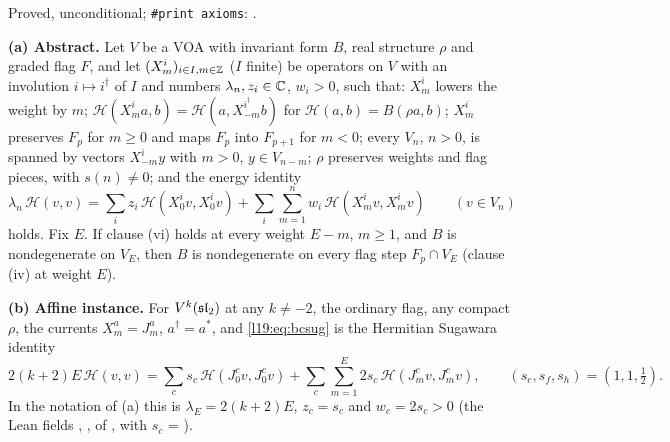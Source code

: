 \begin{status}
Proved, unconditional; \texttt{\#print axioms}: .
\end{status}

\begin{theorem}\label{l19:thm:bcnowall}
\textbf{(a) Abstract.} Let $V$ be a VOA with invariant form $B$, real structure $\rho$ and graded flag $F$, and let
$(X^i_m)_{i\in I,m\in{\mathbb{Z}}}$ ($I$ finite) be operators on $V$ with an involution $i\mapsto i^\dagger$ of $I$ and numbers
$\lambda_n,z_i\in{\mathbb{C}}$, $w_i>0$, such that: $X^i_m$ lowers the weight by $m$; $\mathcal H(X^i_ma,b) = \mathcal H(a,X^{i^\dagger}_{-m}b)$
for $\mathcal H(a,b) = B(\rho a,b)$; $X^i_m$ preserves $F_p$ for $m\ge0$ and maps $F_p$ into $F_{p+1}$ for $m<0$; every
$V_n$, $n>0$, is spanned by vectors $X^i_{-m}y$ with $m>0$, $y\in V_{n-m}$; $\rho$ preserves weights and flag pieces,
with $s(n)\ne0$; and the energy identity
\begin{equation}\label{l19:eq:bcsug}
  \lambda_n\,\mathcal H(v,v) = \sum_iz_i\,\mathcal H(X^i_0v,X^i_0v) + \sum_i\sum_{m=1}^{n}w_i\,\mathcal H(X^i_mv,X^i_mv)\qquad(v\in V_n)
\end{equation}
holds. Fix $E$. If clause (vi) holds at every weight $E-m$, $m\ge1$, and $B$ is nondegenerate on $V_E$, then $B$ is
nondegenerate on every flag step $F_p\cap V_E$ (clause (iv) at weight $E$).

\textbf{(b) Affine instance.} For $V^k(\mathfrak{sl}_2)$ at any $k\ne-2$, the ordinary flag, any compact $\rho$, the
currents $X^a_m = J^a_m$, $a^\dagger = a^*$, and \eqref{l19:eq:bcsug} is the Hermitian Sugawara identity
\begin{equation*}
  2(k+2)E\,\mathcal H(v,v) = \sum_cs_c\,\mathcal H(J^c_0v,J^c_0v) + \sum_c\sum_{m=1}^{E}2s_c\,\mathcal H(J^c_mv,J^c_mv),\qquad
  (s_e,s_f,s_h) = (1,1,\tfrac12).
\end{equation*}
In the notation of (a) this is $\lambda_E = 2(k+2)E$, $z_c = s_c$ and $w_c = 2s_c>0$ (the Lean fields
, ,  of , with $s_c$ = ).
\end{theorem}

